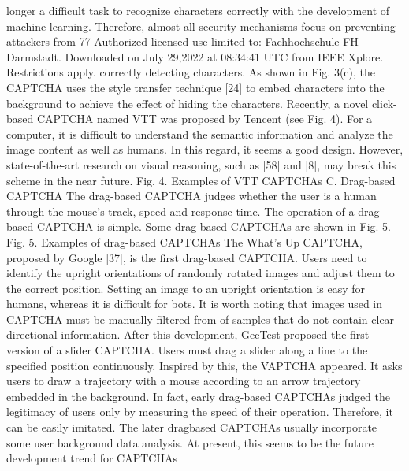 longer a difficult task to recognize characters correctly with
the development of machine learning. Therefore, almost all
security mechanisms focus on preventing attackers from
77
Authorized licensed use limited to: Fachhochschule FH Darmstadt. Downloaded on July 29,2022 at 08:34:41 UTC from IEEE Xplore. Restrictions apply.
correctly detecting characters. As shown in Fig. 3(c), the
CAPTCHA uses the style transfer technique [24] to embed
characters into the background to achieve the effect of hiding
the characters.
Recently, a novel click-based CAPTCHA named VTT was
proposed by Tencent (see Fig. 4). For a computer, it is
difficult to understand the semantic information and analyze
the image content as well as humans. In this regard, it seems a
good design. However, state-of-the-art research on visual
reasoning, such as [58] and [8], may break this scheme in the
near future.
Fig. 4. Examples of VTT CAPTCHAs
C. Drag-based CAPTCHA
The drag-based CAPTCHA judges whether the user is a
human through the mouse’s track, speed and response time.
The operation of a drag-based CAPTCHA is simple. Some
drag-based CAPTCHAs are shown in Fig. 5.
Fig. 5. Examples of drag-based CAPTCHAs
The What’s Up CAPTCHA, proposed by Google [37], is
the first drag-based CAPTCHA. Users need to identify the
upright orientations of randomly rotated images and adjust
them to the correct position. Setting an image to an upright
orientation is easy for humans, whereas it is difficult for bots.
It is worth noting that images used in CAPTCHA must be
manually filtered from of samples that do not contain clear
directional information. After this development, GeeTest
proposed the first version of a slider CAPTCHA. Users must
drag a slider along a line to the specified position
continuously. Inspired by this, the VAPTCHA appeared. It
asks users to draw a trajectory with a mouse according to an
arrow trajectory embedded in the background.
In fact, early drag-based CAPTCHAs judged the
legitimacy of users only by measuring the speed of their
operation. Therefore, it can be easily imitated. The later dragbased CAPTCHAs usually incorporate some user background
data analysis. At present, this seems to be the future
development trend for CAPTCHAs

